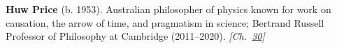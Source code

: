 \textbf{Huw Price} (b. 1953). Australian philosopher of physics known for work on causation, the arrow of time, and pragmatism in science; Bertrand Russell Professor of Philosophy at Cambridge (2011–2020). \emph{[Ch.~\hyperref[ch:simpsonsparadox]{30}]}

